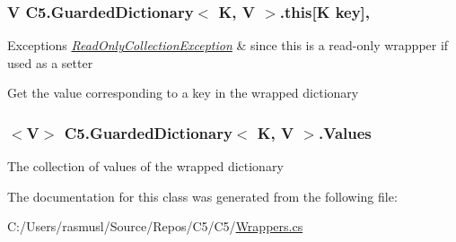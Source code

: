 \subsubsection[{this[K key]}]{\setlength{\rightskip}{0pt plus 5cm}V {\bf C5.\+Guarded\+Dictionary}$<$ K, V $>$.this\mbox{[}K key\mbox{]}\hspace{0.3cm}{\ttfamily [get]}, {\ttfamily [set]}}\label{class_c5_1_1_guarded_dictionary_a721d36a134e3aa6ff2c92cf6bffb9fb3}





\begin{DoxyExceptions}{Exceptions}
{\em \hyperlink{class_c5_1_1_read_only_collection_exception}{Read\+Only\+Collection\+Exception}} & since this is a read-\/only wrappper if used as a setter\\
\hline
\end{DoxyExceptions}


Get the value corresponding to a key in the wrapped dictionary\hypertarget{class_c5_1_1_guarded_dictionary_ab5aef218f548d9a8abb97ff033be4173}{}
\subsubsection[{Values}]{$<$V$>$ {\bf C5.\+Guarded\+Dictionary}$<$ K, V $>$.Values\hspace{0.3cm}{\ttfamily [get]}}\label{class_c5_1_1_guarded_dictionary_ab5aef218f548d9a8abb97ff033be4173}




The collection of values of the wrapped dictionary

The documentation for this class was generated from the following file\+:\begin{DoxyCompactItemize}
\item 
C\+:/\+Users/rasmusl/\+Source/\+Repos/\+C5/\+C5/\hyperlink{_wrappers_8cs}{Wrappers.\+cs}\end{DoxyCompactItemize}
